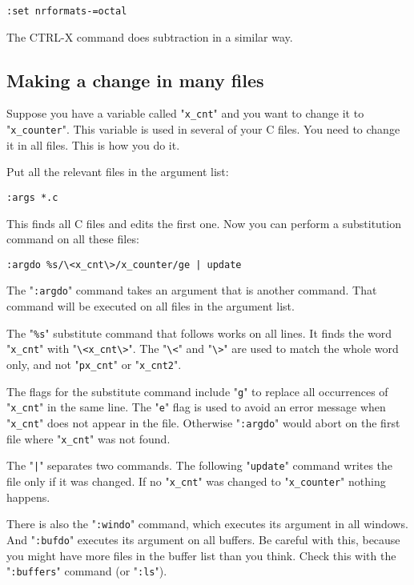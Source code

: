 \begin{Verbatim}[samepage=true]
 :set nrformats-=octal
\end{Verbatim}

The CTRL-X command does subtraction in a similar way.
\subsection{Making a change in many files}
Suppose you have a variable called "\texttt{x\_cnt}" and you want to change it to "\texttt{x\_counter}".
This variable is used in several of your C files.
You need to change it in all files.
This is how you do it.

Put all the relevant files in the argument list:

\begin{Verbatim}[samepage=true]
 :args *.c
\end{Verbatim}
 
This finds all C files and edits the first one.
Now you can perform a substitution command on all these files:

\begin{Verbatim}[samepage=true]
 :argdo %s/\<x_cnt\>/x_counter/ge | update
\end{Verbatim}

The "\texttt{:argdo}" command takes an argument that is another command.
That command will be executed on all files in the argument list.

The "\texttt{\%s}" substitute command that follows works on all lines.
It finds the word "\texttt{x\_cnt}" with "\texttt{\textbackslash<x\_cnt\textbackslash>}".
The "\texttt{\textbackslash<}" and "\texttt{\textbackslash>}" are used to match the whole word only, and not "\texttt{px\_cnt}" or "\texttt{x\_cnt2}".

The flags for the substitute command include "\texttt{g}" to replace all occurrences of "\texttt{x\_cnt}" in the same line.
The "\texttt{e}" flag is used to avoid an error message when "\texttt{x\_cnt}" does not appear in the file.
Otherwise "\texttt{:argdo}" would abort on the first file where "\texttt{x\_cnt}" was not found.

The "\texttt{|}" separates two commands.
The following "\texttt{update}" command writes the file only if it was changed.
If no "\texttt{x\_cnt}" was changed to "\texttt{x\_counter}" nothing happens.

There is also the "\texttt{:windo}" command, which executes its argument in all windows.
And "\texttt{:bufdo}" executes its argument on all buffers.
Be careful with this, because you might have more files in the buffer list than you think.
Check this with the "\texttt{:buffers}" command (or "\texttt{:ls}").
